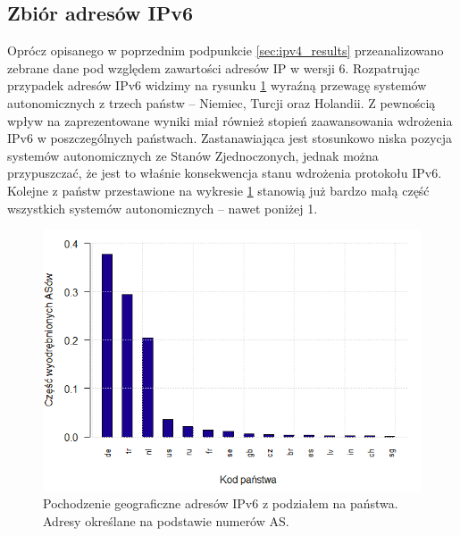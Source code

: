 \subsection{Zbiór adresów IPv6}
Oprócz opisanego w poprzednim podpunkcie \ref{sec:ipv4_results} przeanalizowano zebrane dane pod względem zawartości adresów IP
w wersji 6. Rozpatrując przypadek adresów IPv6 widzimy na rysunku \ref{fig:ipv6_as_countries} wyraźną przewagę systemów autonomicznych
z trzech państw -- Niemiec, Turcji oraz Holandii. Z pewnością wpływ na zaprezentowane wyniki miał również stopień zaawansowania
wdrożenia IPv6 w poszczególnych państwach. Zastanawiająca jest stosunkowo niska pozycja systemów autonomicznych ze Stanów Zjednoczonych,
jednak można przypuszczać, że jest to właśnie konsekwencja stanu wdrożenia protokołu IPv6. Kolejne z państw przestawione na
wykresie \ref{fig:ipv6_as_countries} stanowią już bardzo małą część wszystkich systemów autonomicznych -- nawet poniżej 1\textperthousand.
\begin{figure}[h]
	\centering
	\includegraphics[width=1.0\textwidth]{image/ipv6_countries_no_title}
	\caption{Pochodzenie geograficzne adresów IPv6 z podziałem na państwa. Adresy określane na podstawie numerów AS.}
	\label{fig:ipv6_as_countries}
\end{figure}

